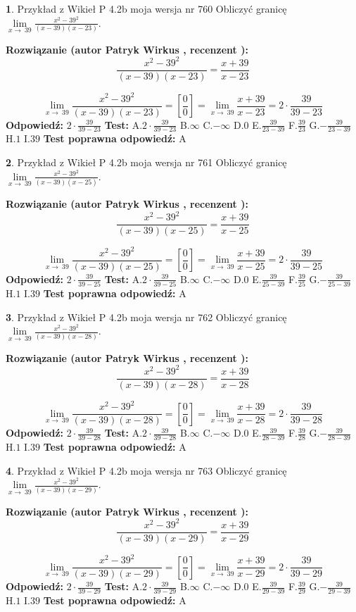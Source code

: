 \documentclass[12pt, a4paper]{article}
\theoremstyle{definition} %
\newtheorem{zad}{}
\newcommand{\zadStart}[1]{\begin{zad}#1\newline}
\newcommand{\zadStop}{\end{zad}}
\newcommand{\rozwStart}[2]{\noindent \textbf{Rozwiązanie (autor #1 , recenzent #2): }\newline}
\newcommand{\rozwStop}{\newline}
\newcommand{\odpStart}{\noindent \textbf{Odpowiedź:}\newline}
\newcommand{\odpStop}{\newline}
\newcommand{\testStart}{\noindent \textbf{Test:}\newline}
\newcommand{\testStop}{\newline}
\newcommand{\kluczStart}{\noindent \textbf{Test poprawna odpowiedź:}\newline}
\newcommand{\kluczStop}{\newline}
\begin{document}
\zadStart{Przykład z Wikieł P 4.2b moja wersja nr 760}
Obliczyć granicę $\lim\limits_{x\to\ 39}\frac{x^{2}-39^{2}}{(x-39)(x-23)}$.
\zadStop
\rozwStart{Patryk Wirkus}{}
$$\frac{x^{2}-39^{2}}{(x-39)(x-23)}=\frac{x+39}{x-23}$$

$$\lim\limits_{x\to\ 39}\frac{x^{2}-39^{2}}{(x-39)(x-23)}=[\frac{0}{0}]=\lim\limits_{x\to\ 39}\frac{x+39}{x-23}=2 \cdot \frac{39}{39-23}$$
\rozwStop
\odpStart
$2 \cdot \frac{39}{39-23}$
\odpStop
\testStart
A.$2 \cdot \frac{39}{39-23}$
B.$\infty$
C.$-\infty$
D.$0$
E.$\frac{39}{23-39}$
F.$\frac{39}{23}$
G.$-\frac{39}{23-39}$
H.$1$
I.$39$
\testStop
\kluczStart
A
\kluczStop



\zadStart{Przykład z Wikieł P 4.2b moja wersja nr 761}
Obliczyć granicę $\lim\limits_{x\to\ 39}\frac{x^{2}-39^{2}}{(x-39)(x-25)}$.
\zadStop
\rozwStart{Patryk Wirkus}{}
$$\frac{x^{2}-39^{2}}{(x-39)(x-25)}=\frac{x+39}{x-25}$$

$$\lim\limits_{x\to\ 39}\frac{x^{2}-39^{2}}{(x-39)(x-25)}=[\frac{0}{0}]=\lim\limits_{x\to\ 39}\frac{x+39}{x-25}=2 \cdot \frac{39}{39-25}$$
\rozwStop
\odpStart
$2 \cdot \frac{39}{39-25}$
\odpStop
\testStart
A.$2 \cdot \frac{39}{39-25}$
B.$\infty$
C.$-\infty$
D.$0$
E.$\frac{39}{25-39}$
F.$\frac{39}{25}$
G.$-\frac{39}{25-39}$
H.$1$
I.$39$
\testStop
\kluczStart
A
\kluczStop



\zadStart{Przykład z Wikieł P 4.2b moja wersja nr 762}
Obliczyć granicę $\lim\limits_{x\to\ 39}\frac{x^{2}-39^{2}}{(x-39)(x-28)}$.
\zadStop
\rozwStart{Patryk Wirkus}{}
$$\frac{x^{2}-39^{2}}{(x-39)(x-28)}=\frac{x+39}{x-28}$$

$$\lim\limits_{x\to\ 39}\frac{x^{2}-39^{2}}{(x-39)(x-28)}=[\frac{0}{0}]=\lim\limits_{x\to\ 39}\frac{x+39}{x-28}=2 \cdot \frac{39}{39-28}$$
\rozwStop
\odpStart
$2 \cdot \frac{39}{39-28}$
\odpStop
\testStart
A.$2 \cdot \frac{39}{39-28}$
B.$\infty$
C.$-\infty$
D.$0$
E.$\frac{39}{28-39}$
F.$\frac{39}{28}$
G.$-\frac{39}{28-39}$
H.$1$
I.$39$
\testStop
\kluczStart
A
\kluczStop



\zadStart{Przykład z Wikieł P 4.2b moja wersja nr 763}
Obliczyć granicę $\lim\limits_{x\to\ 39}\frac{x^{2}-39^{2}}{(x-39)(x-29)}$.
\zadStop
\rozwStart{Patryk Wirkus}{}
$$\frac{x^{2}-39^{2}}{(x-39)(x-29)}=\frac{x+39}{x-29}$$

$$\lim\limits_{x\to\ 39}\frac{x^{2}-39^{2}}{(x-39)(x-29)}=[\frac{0}{0}]=\lim\limits_{x\to\ 39}\frac{x+39}{x-29}=2 \cdot \frac{39}{39-29}$$
\rozwStop
\odpStart
$2 \cdot \frac{39}{39-29}$
\odpStop
\testStart
A.$2 \cdot \frac{39}{39-29}$
B.$\infty$
C.$-\infty$
D.$0$
E.$\frac{39}{29-39}$
F.$\frac{39}{29}$
G.$-\frac{39}{29-39}$
H.$1$
I.$39$
\testStop
\kluczStart
A
\kluczStop
\end{document}
